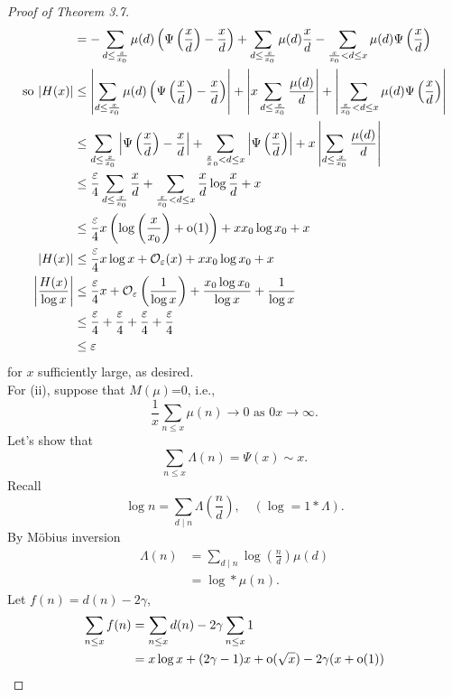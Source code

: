 \documentclass[twoside, openright, fontsize=10pt, headings=big]{scrbook}
\begin{document}
\begin{proof}[Proof of Theorem 3.7]
\begin{align*}
        &=-\sum_{d\leq\frac{x}{x_0}}\mu(d)\left(\Psi\left(\frac{x}{d}\right)-\frac{x}{d}\right)+\sum_{d\leq\frac{x}{x_0}}\mu(d)\frac{x}{d}-\sum_{\frac{x}{x_0}<d\leq x}\mu(d)\Psi\left(\frac{x}{d}\right)\\
        \text{so }|H(x)|&\leq\left|\sum_{d\leq\frac{x}{x_0}}\mu(d)\left(\Psi\left(\frac{x}{d}\right)-\frac{x}{d}\right)\right|+\left|x\sum_{d\leq\frac{x}{x_0}}\frac{\mu(d)}{d}\right|+\left|\sum_{\frac{x}{x_0}<d\leq x}\mu(d)\Psi\left(\frac{x}{d}\right)\right|\\
        &\leq\sum_{d\leq\frac{x}{x_0}}\left|\Psi\left(\frac{x}{d}\right)-\frac{x}{d}\right|+\sum_{\frac{x}{x}_0<d\leq x}\left|\Psi\left(\frac{x}{d}\right)\right|+x\left|\sum_{d\leq\frac{x}{x_0}}\frac{\mu(d)}{d}\right|\\
        &\leq\frac{\varepsilon}{4}\sum_{d\leq\frac{x}{x_0}}\frac{x}{d}+\sum_{\frac{x}{x_0}<d\leq x}\frac{x}{d}\log\frac{x}{d}+x\\
        &\leq\frac{\varepsilon}{4}x\left(\log\left(\frac{x}{x_0}\right)+\text{o}(1)\right)+xx_0\log x_0+x\\
        |H(x)|&\leq\frac{\varepsilon}{4}x\log x+\mathcal{O}_{\varepsilon}(x)+xx_0\log x_0+x\\
        \left|\frac{H(x)}{\log x}\right|&\leq\frac{\varepsilon}{4}x+\mathcal{O}_{\varepsilon}\left(\frac{1}{\log x}\right)+\frac{x_0\log x_0}{\log x}+\frac{1}{\log x}\\
        &\leq\frac{\varepsilon}{4}+\frac{\varepsilon}{4}+\frac{\varepsilon}{4}+\frac{\varepsilon}{4}\\
        &\leq\varepsilon
    \end{align*}
    for $x$ sufficiently large, as desired.\\
    For (ii), suppose that $M(\mu)$=0, i.e.,
    \[
        \frac{1}{x}\sum_{n\leq x}\mu(n)\to0\text{ as }0x\to\infty.
    \]
    Let's show that
    \[
        \sum_{n\leq x}\Lambda(n)=\Psi(x)\sim x.
    \]
    Recall
    \[
        \log n=\sum_{d\mid n}\Lambda\left(\frac{n}{d}\right),\quad (\log=1\ast\Lambda).
    \]
    By M{\"o}bius inversion
    \begin{align*}
        \Lambda(n)&=\sum_{d\mid n}\log\left(\frac{n}{d}\right)\mu(d)\\
        &=\log\ast\mu(n).
    \end{align*}
    Let $f(n)=d(n)-2\gamma$,
    \begin{align*}
        \sum_{n\leq x}f(n)&=\sum_{n\leq x}d(n)-2\gamma\sum_{n\leq x}1\\
        &=x\log x+(2\gamma-1)x+\oh(\sqrt{x})-2\gamma(x+\oh(1))\\

\end{align*}
\end{proof}
\end{document}

